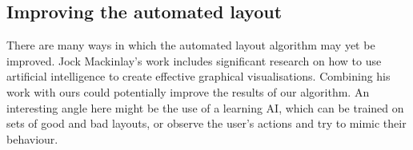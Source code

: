    \subsection{Improving the automated layout}

    There are many ways in which the automated layout algorithm may yet be
    improved. Jock Mackinlay's work \citep{mackinlay-1} includes significant
    research on how to use artificial intelligence to create effective
    graphical visualisations. Combining his work with ours could potentially
    improve the results of our algorithm. An interesting angle here might be
    the use of a learning AI, which can be trained on sets of good and bad
    layouts, or observe the user's actions and try to mimic their behaviour.

